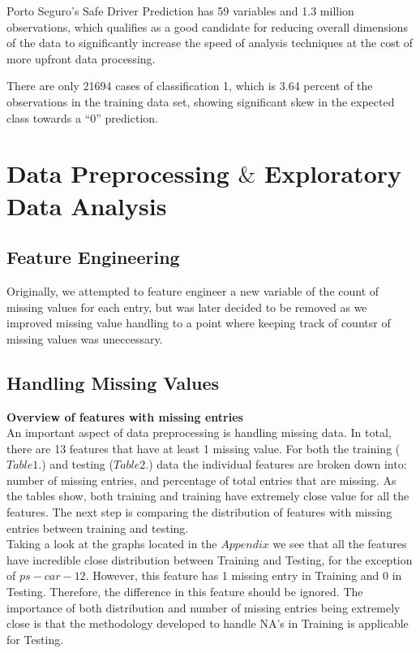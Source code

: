 \documentclass[fleqn,10pt]{SelfArx} %
\begin{document}
Porto Seguro’s Safe Driver Prediction has 59 variables and 1.3 million observations, which qualifies as a good candidate for reducing overall dimensions of the data to significantly increase the speed of analysis techniques at the cost of more upfront data processing.


There are only 21694 cases of classification 1, which is 3.64 percent of the observations in the training data set, showing significant skew in the expected class towards a ``0'' prediction.


\bigskip
\bigskip


\section{Data Preprocessing $\&$ Exploratory Data Analysis} %

\subsection{Feature Engineering}
Originally, we attempted to feature engineer a new variable of the count of missing values for each entry, but was later decided to be removed as we improved missing value handling to a point where keeping track of countsr of missing values was uneccessary.
\subsection{Handling Missing Values}
\textbf{Overview of features with missing entries}\\
An important aspect of data preprocessing is handling missing data. In total, there are 13 features that have at least 1 missing value. For both the training ($Table 1.$) and testing ($Table 2.$) data the individual features are broken down into: number of missing entries, and percentage of total entries that are missing. As the tables show, both training and training have extremely close value for all the features. The next step is comparing the distribution of features with missing entries between training and testing.\\  
Taking a look at the graphs located in the $Appendix$ we see that all the features have incredible close distribution between Training and Testing, for the exception of $ps-car-12$. However, this feature has 1 missing entry in Training and 0 in Testing. Therefore, the difference in this feature should be ignored. The importance of both distribution and number of missing entries being extremely close is that the methodology developed to handle NA's in Training is applicable for Testing. \\
\\
\end{document}
